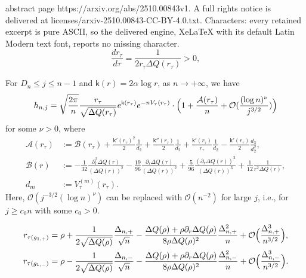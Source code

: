 \documentclass[10pt,a4paper]{amsart}
\begin{document}
abstract page https://arxiv.org/abs/2510.00843v1. A full rights notice is delivered at licenses/arxiv-2510.00843-CC-BY-4.0.txt. Characters: every retained excerpt is pure ASCII, so the delivered engine, XeLaTeX with its default Latin Modern text font, reports no missing character.
\begin{equation}
\label{def of rtau ODE}
\frac{dr_{\tau}}{d\tau}=\frac{1}{2r_{\tau}\Delta Q(r_{\tau})}>0,
\end{equation}

\begin{lemma}\label{lemma:hnj asymptotics}
For $D_n\leq j\leq n-1$ and $\mathsf{k}(r)=2\alpha\log r$, as $n\to+\infty$, we have 
\begin{equation}
\label{def of Dn leq j leq n-1}
h_{n,j}
=\sqrt{\frac{2\pi}{n}} \frac{r_{\tau}}{\sqrt{\Delta Q(r_{\tau})}}e^{\mathsf{k}(r_{\tau})}e^{-nV_{\tau}(r_{\tau})}\cdot\Bigl(1+\frac{\mathcal{A}(r_{\tau})}{n}+\mathcal{O}(\frac{(\log n)^{\nu}}{j^{3/2}})\Bigr)    
\end{equation}
for some $\nu>0$, where
\begin{align*}
\mathcal{A}(r_{\tau})&:=\mathcal{B}(r_{\tau})+\frac{\mathsf{k}'(r_{\tau})^2}{2}\frac{1}{d_2}+\frac{\mathsf{k}''(r_{\tau})}{2}\frac{1}{d_2}+\frac{\mathsf{k}'(r_{\tau})}{r_{\tau}}\frac{1}{d_2}-\frac{\mathsf{k}'(r_{\tau})}{2}\frac{d_3}{d_2^2},   
\\
\mathcal{B}(r)&:=-\frac{1}{32}\frac{\partial_r^2\Delta Q(r)}{(\Delta Q(r))^2}-\frac{19}{96}\frac{\partial_r\Delta Q(r)}{(\Delta Q(r))^2}+\frac{5}{96}\frac{(\partial_r \Delta Q(r))^2}{(\Delta Q(r))^3}+\frac{1}{12}\frac{1}{r^2\Delta Q(r)},      \\
d_m&:=V_{\tau}^{(m)}(r_{\tau}).
\end{align*}
Here, $\mathcal{O}(j^{-3/2}(\log n)^{\nu})$ can be replaced with $\mathcal{O}(n^{-2})$ for large $j$, i.e., for $j\geq c_0 n$ with some $c_0>0$. 
\end{lemma}

\begin{align}
\label{def of rtau g1plus}
    r_{\tau(g_{1,+})}
&=
\rho+\frac{1}{2\sqrt{\Delta Q(\rho)}}\frac{\Delta_{n,+}}{\sqrt{n}}
-\frac{\Delta Q(\rho)+\rho\partial_r\Delta Q(\rho)}{8\rho \Delta Q(\rho)^2}\frac{\Delta_{n,+}^2}{n}+\mathcal{O}\Bigl(\frac{\Delta_{n,+}^3}{n^{3/2}}\Bigr), 
\\
\label{def of rtau g1minus}
r_{\tau(g_{1,-})}
&=\rho-\frac{1}{2\sqrt{\Delta Q(\rho)}}\frac{\Delta_{n,-}}{\sqrt{n}}
-\frac{\Delta Q(\rho)+\rho\partial_r\Delta Q(\rho)}{8\rho \Delta Q(\rho)^2}\frac{\Delta_{n,-}^2}{n}+\mathcal{O}\Bigl(\frac{\Delta_{n,-}^3}{n^{3/2}}\Bigr).
\end{align}
\end{document}
